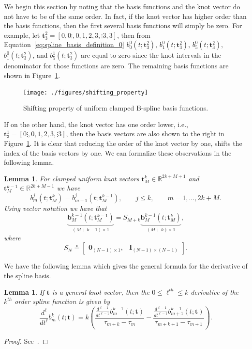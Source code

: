 \documentclass{article}
\newtheorem{lemma}[theorem]{Lemma}
\newcommand{\defeq}{\circeq}
\newcommand{\bbf}{\mathbf{b}}
\begin{document}
We begin this section by noting that the basis functions and the knot vector do not have to be of the same order.  In fact, if the knot vector has higher order than the basis functions, then the first several basis functions will simply be zero.  
For example, let $\mathbf{t}_3^2 = [0, 0\vdots, 0, 1, 2, 3, \vdots 3, 3]$, then from Equation~\eqref{eq:spline_basis_definition_0} $b_0^0(t; \mathbf{t}_3^2)$, $b_1^0(t; \mathbf{t}_3^2)$, $b_5^0(t; \mathbf{t}_3^2)$, $b_1^0(t; \mathbf{t}_3^2)$, and $b_5^1(t; \mathbf{t}_3^2)$ are equal to zero since the knot intervals in the denominator for those functions are zero.  The remaining basis functions are shown in Figure~\ref{fig:shifting_property}.
\begin{figure}[hbt]
  \centering\texttt{[image: ./figures/shifting\_property]}
  \caption{Shifting property of uniform clamped B-spline basis functions.}
  \label{fig:shifting_property}  
\end{figure}
If on the other hand, the knot vector has one order lower, i.e., $\mathbf{t}_3^1 = [0\vdots, 0, 1, 2, 3, \vdots 3]$, then the basis vectors are also shown to the right in Figure~\ref{fig:shifting_property}.  It is clear that reducing the order of the knot vector by one, shifts the index of the basis vectors by one.  We can formalize these observations in the following lemma.
\begin{lemma} \label{lem:shifting_property}
For clamped uniform knot vectors $\mathbf{t}_M^k \in \mathbb{R}^{2k+M+1}$ and $\mathbf{t}_M^{k-1}\in\mathbb{R}^{2k+M-1}$ we have
\[
b_m^j(t; \mathbf{t}_M^k) = b_{m-1}^j(t; \mathbf{t}_M^{k-1}), \qquad j \leq k, \qquad m = 1, \dots, 2k+M.
\]	
Using vector notation we have that
\[
\underbrace{\bbf_M^{k-1}(t; \mathbf{t}_M^{k-1})}_{(M+k-1)\times 1} = S_{M+k} \underbrace{\bbf_M^{k-1}(t; \mathbf{t}_M^k)}_{(M+k)\times 1},
\]
where
\[
	S_{N} \defeq \begin{bmatrix} \mathbf{0}_{(N-1)\times 1}, & \mathbf{I}_{(N-1) \times (N-1)} \end{bmatrix}.
\]
\end{lemma}

We have the following lemma which gives the general formula for the derivative of the spline basis.
\begin{lemma}\label{lem:derivative_basis_functions}
If $\mathbf{t}$ is a general knot vector, then the $0\leq \ell^{th} \leq k$ derivative of the $k^{th}$ order spline function is given by
\[
\frac{d^\ell}{dt^\ell}b_m^k(t; \mathbf{t}) = k\left(\frac{\frac{d^{\ell-1}}{dt^{\ell-1}}b_m^{k-1}(t; \mathbf{t})}{\tau_{m+k}-\tau_m} - \frac{\frac{d^{\ell-1}}{dt^{\ell-1}}b_{m+1}^{k-1}(t; \mathbf{t})}{\tau_{m+k+1}-\tau_{m+1}} \right).
\]	
\end{lemma}
\begin{proof}
See~\cite{PieglTiller95}.
\end{proof}
\end{document}
